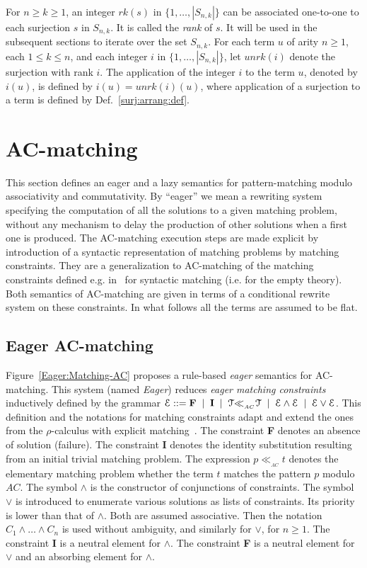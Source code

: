 \documentclass[submission,copyright,creativecommons]{eptcs}
\newcommand \matchth[3]{#1 {\ll}_{{ }_{#3}} {#2}}
\newcommand \matchAC[2]{\matchth{#1}{#2}{AC}}
\newcommand \Eu[1]{\EuScript{#1}}
\numberwithin{subcase}{case}
\begin{document}
For $n\ge k \ge 1$, an integer $\textit{rk}(s)$ in $\{1, \ldots, |S_{n,k}|\}$
can be associated one-to-one to each surjection $s$ in $S_{n,k}$. It is called
the \emph{rank} of $s$.  It will be used in the subsequent sections to iterate
over the set $S_{n,k}$.
For each term $u$ of arity $n \geq 1$, each $1 \leq k \leq n$, and each integer
$i$ in $\{1,\ldots,|S_{n,k}|\}$, let $\textit{unrk}(i)$ denote the surjection
with rank $i$. The application of the integer $i$ to the term $u$, denoted by
$i(u)$, is defined by $i(u) = \textit{unrk}(i)(u)$, where application of a
surjection to a term is defined by Def.~\ref{surj:arrang:def}.

\section{AC-matching}
\label{ac:match:sec}
This section defines an eager and a lazy semantics for pattern-matching modulo
associativity and commutativity. By ``eager'' we mean a rewriting system
specifying the computation of all the solutions to a given matching problem,
without any mechanism to delay the production of other solutions when a first one
is produced. The AC-matching execution steps are made explicit by introduction of
a syntactic representation of matching problems by matching constraints. They are
a generalization to AC-matching of the matching constraints defined e.g.
in~\cite{CFK07} for syntactic matching (i.e. for the empty theory). Both
semantics of AC-matching are given in terms of a conditional rewrite system on
these constraints. In what follows all the terms are assumed to be flat.

\subsection{Eager AC-matching}
Figure~\ref{Eager:Matching-AC} proposes a rule-based \emph{eager} semantics for
AC-matching. This system (named \textit{Eager}) reduces \emph{eager matching
constraints} inductively defined by the grammar $\Eu{E} ::= \textbf{F} \;\;|\;\;
\textbf{I} \;\;|\;\;
 \matchAC{\Eu{T}}{\Eu{T}} \;\;|\;\; \Eu{E} \land \Eu{E} \;\;|\;\; \Eu{E} \lor
 \Eu{E}$.
This definition and the notations for matching constraints adapt and extend  the
ones from the $\rho$-calculus with explicit matching~\cite{CFK07}. The
constraint \textbf{F} denotes
 an absence of solution (failure). The constraint \textbf{I} denotes the
 identity substitution resulting from an initial trivial matching problem. The
 expression $\matchAC{p}{t}$ denotes the
elementary matching problem whether the term $t$ matches the pattern $p$ modulo
$AC$. The symbol $\land$ is the constructor of conjunctions of
 constraints. The symbol $\lor$ is introduced to enumerate various solutions as
 lists of constraints. Its priority is lower than that of $\land$. Both are
 assumed associative. Then the notation $C_1 \land \ldots \land C_n$ is used
 without ambiguity, and similarly for $\lor$, for $n \geq 1$. The constraint
 \textbf{I} is a neutral element for $\land$. The constraint \textbf{F} is a
 neutral element for $\lor$ and an absorbing element for $\land$.
\end{document}

